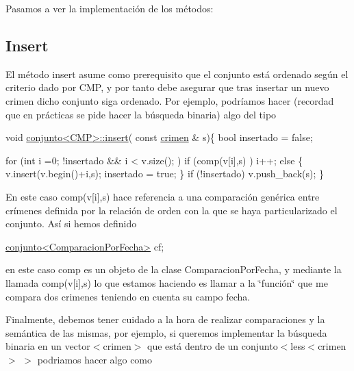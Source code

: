 Pasamos a ver la implementación de los métodos\+:\hypertarget{index_insert}{}\subsection{Insert}\label{index_insert}
El método insert asume como prerequisito que el conjunto está ordenado según el criterio dado por C\+M\+P, y por tanto debe asegurar que tras insertar un nuevo crimen dicho conjunto siga ordenado. Por ejemplo, podríamos hacer (recordad que en prácticas se pide hacer la búsqueda binaria) algo del tipo 
\begin{DoxyCode}
\textcolor{keywordtype}{void} \hyperlink{classconjunto_adb7f70590741e9f7db3a28de60f4452a}{conjunto<CMP>::insert}( \textcolor{keyword}{const} \hyperlink{classcrimen}{crimen} & s)\{
        \textcolor{keywordtype}{bool} insertado = \textcolor{keyword}{false};

        \textcolor{keywordflow}{for} (\textcolor{keywordtype}{int} i =0; !insertado && i < v.size(); )
            \textcolor{keywordflow}{if} (comp(v[i],s) ) i++;
            \textcolor{keywordflow}{else} \{
              v.insert(v.begin()+i,s);
              insertado = \textcolor{keyword}{true};
            \}
        \textcolor{keywordflow}{if} (!insertado) v.push\_back(s);
     \}
\end{DoxyCode}


En este caso comp(v\mbox{[}i\mbox{]},s) hace referencia a una comparación genérica entre crímenes definida por la relación de orden con la que se haya particularizado el conjunto. Así si hemos definido


\begin{DoxyCode}
\hyperlink{classconjunto}{conjunto<ComparacionPorFecha>} cf;
\end{DoxyCode}


en este caso comp es un objeto de la clase Comparacion\+Por\+Fecha, y mediante la llamada comp(v\mbox{[}i\mbox{]},s) lo que estamos haciendo es llamar a la \char`\"{}función\char`\"{} que me compara dos crimenes teniendo en cuenta su campo fecha.

Finalmente, debemos tener cuidado a la hora de realizar comparaciones y la semántica de las mismas, por ejemplo, si queremos implementar la búsqueda binaria en un vector$<$crimen$>$ que está dentro de un conjunto$<$less$<$crimen$>$ $>$ podriamos hacer algo como


